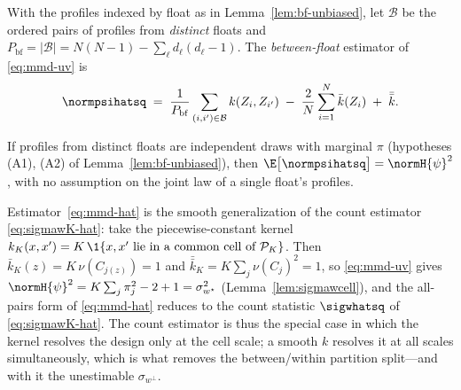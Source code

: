 \begin{definition}
\label{def:mmd-hat}
With the profiles indexed by float as in Lemma~\ref{lem:bf-unbiased}, let
$\mathcal B$ be the ordered pairs of profiles from \emph{distinct} floats and
$P_{\mathrm{bf}}=|\mathcal B|=N(N-1)-\sum_\ell d_\ell(d_\ell-1)$. The
\emph{between-float} estimator of \eqref{eq:mmd-uv} is
\begin{equation}
  \normpsihatsq
  \;=\;\frac{1}{P_{\mathrm{bf}}}\sum_{(i,i')\in\mathcal B}k(Z_i,Z_{i'})
      \;-\;\frac{2}{N}\sum_{i=1}^{N}\bar k(Z_i)
      \;+\;\bar{\bar k}.
  \label{eq:mmd-hat}
\end{equation}
\end{definition}

\begin{lemma}[Unbiasedness]
\label{lem:mmd-unbiased}
If profiles from distinct floats are independent draws with marginal $\pi$
(hypotheses \textup{(A1)}, \textup{(A2)} of Lemma~\ref{lem:bf-unbiased}), then
$\E\big[\normpsihatsq\big]=\normH{\psi}^2$, with no assumption on the joint law
of a single float's profiles.
\end{lemma}

\begin{remark}
\label{rem:mmd-reduction}
Estimator~\eqref{eq:mmd-hat} is the smooth generalization of the count estimator
\eqref{eq:sigmawK-hat}: take the piecewise-constant kernel
$k_K(x,x')=K\,\1\{x,x'\text{ lie in a common cell of }\mathcal P_K\}$. Then
$\bar k_K(z)=K\,\nu(C_{j(z)})=1$ and $\bar{\bar k}_K=K\sum_j\nu(C_j)^2=1$, so
\eqref{eq:mmd-uv} gives $\normH{\psi}^2=K\sum_j\pi_j^2-2+1=\sigma_{w^{\star}}^2$
(Lemma~\ref{lem:sigmawcell}), and the all-pairs form of \eqref{eq:mmd-hat}
reduces to the count statistic $\sigwhatsq$ of \eqref{eq:sigmawK-hat}. The count estimator is
thus the special case in which the kernel resolves the design only at the cell
scale; a smooth $k$ resolves it at all scales simultaneously, which is what
removes the between/within partition split---and with it the unestimable
$\sigma_{w^{\perp}}$.
\end{remark}

